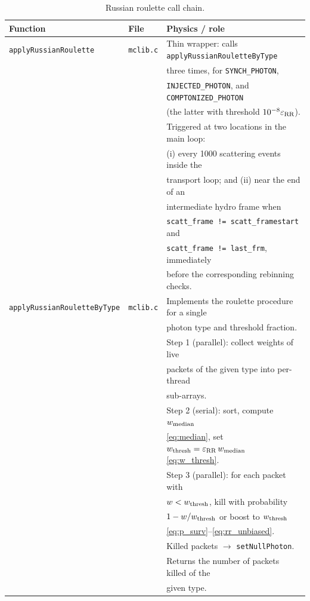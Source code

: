 \documentclass[12pt,a4paper]{article}
\newcommand{\code}[1]{\texttt{#1}}
\begin{document}
\begin{table}[h]
	\centering
	\caption{Russian roulette call chain.}
	\label{tab:callchain_rr}
	\renewcommand{\arraystretch}{1.4}
	\begin{tabular}{p{} p{} p{}}
		\toprule
		\textbf{Function} & \textbf{File} & \textbf{Physics / role} \\
		\midrule
		\code{applyRussianRoulette}
		& \code{mclib.c}
		& Thin wrapper: calls \code{applyRussianRouletteByType} \\
		& & three times, for \code{SYNCH\_PHOTON}, \\
		& & \code{INJECTED\_PHOTON}, and \code{COMPTONIZED\_PHOTON} \\
		& & (the latter with threshold $10^{-8}\varepsilon_{\rm RR}$). \\
		& & Triggered at two locations in the main loop: \\
		& & (i) every 1000 scattering events inside the \\
		& & transport loop; and (ii) near the end of an \\
		& & intermediate hydro frame when \\
		& & \code{scatt\_frame != scatt\_framestart} and \\
		& & \code{scatt\_frame != last\_frm}, immediately \\
		& & before the corresponding rebinning checks. \\
		\midrule
		\code{applyRussianRouletteByType}
		& \code{mclib.c}
		& Implements the roulette procedure for a single \\
		& & photon type and threshold fraction. \\
		& & Step 1 (parallel): collect weights of live \\
		& & packets of the given type into per-thread \\
		& & sub-arrays. \\
		& & Step 2 (serial): sort, compute $w_{\rm median}$ \\
		& & \eqref{eq:median}, set $w_{\rm thresh} =
		\varepsilon_{\rm RR}\,w_{\rm median}$ \eqref{eq:w_thresh}. \\
		& & Step 3 (parallel): for each packet with \\
		& & $w < w_{\rm thresh}$, kill with probability \\
		& & $1 - w/w_{\rm thresh}$ or boost to $w_{\rm thresh}$ \\
		& & \eqref{eq:p_surv}--\eqref{eq:rr_unbiased}. \\
		& & Killed packets $\to$ \code{setNullPhoton}. \\
		& & Returns the number of packets killed of the \\
		& & given type. \\
		\bottomrule
	\end{tabular}
\end{table}
\end{document}
